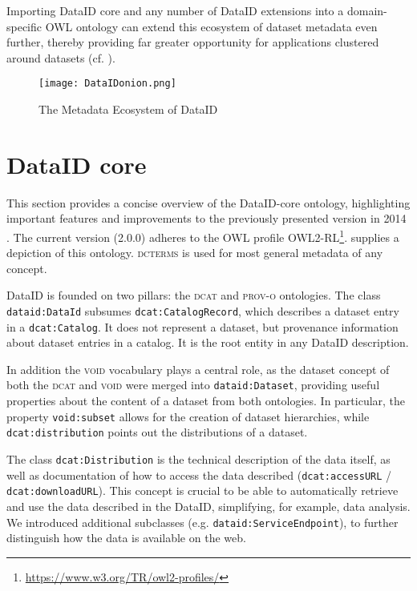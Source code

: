 \documentclass[runningheads,a4paper]{llncs}
\newcommand{\prov}{{\scshape prov-o}\xspace}
\newcommand{\void}{{\scshape void}\xspace}
\newcommand{\dct}{{\scshape dcterms}\xspace}
\newcommand{\dcat}{{\scshape dcat}\xspace}
\newcommand{\prop}[1]{{{\texttt{#1}}}}
\newcommand\footnoteurl[1]{\footnote{\scriptsize\url{#1}}}
\begin{document}
Importing DataID core and any number of DataID extensions into a domain-specific OWL ontology can extend this ecosystem of dataset metadata even further, thereby providing far greater opportunity for applications clustered around datasets (cf. ).

\begin{figure}[t]
\centering
  \texttt{[image: DataIDonion.png]}
  \caption{The Metadata Ecosystem of DataID}
  \label{fig:onion}
  \vspace{-1.5em}
\end{figure}

\section{DataID core} %
\label{dataidCore}
This section provides a concise overview of the DataID-core ontology, highlighting important features and improvements to the previously presented version in 2014 \cite{dataID2014}. The current version (2.0.0) adheres to the OWL profile OWL2-RL\footnoteurl{https://www.w3.org/TR/owl2-profiles/}.
 supplies a depiction of this ontology. \dct is used for most general metadata of any concept.

DataID is founded on two pillars: the \dcat and \prov ontologies. The class \prop{dataid:DataId} subsumes \prop{dcat:CatalogRecord}, which describes a dataset entry in a \prop{dcat:Catalog}. It does not represent a dataset, but provenance information about dataset entries in a catalog. It is the root entity in any DataID description.

In addition the \void vocabulary plays a central role, as the dataset concept of both the \dcat and \void were merged into \prop{dataid:Dataset}, providing useful properties about the content of a dataset from both ontologies. In particular, the property \prop{void:subset} allows for the creation of dataset hierarchies, while \prop{dcat:distribution} points out the distributions of a dataset.

The class \prop{dcat:Distribution} is the technical description of the data itself, as well as documentation of how to access the data described (\prop{dcat:accessURL} / \prop{dcat:downloadURL}). This concept is crucial to be able to automatically retrieve and use the data described in the DataID, simplifying, for example, data analysis. We introduced additional subclasses (e.g. \prop{dataid:ServiceEndpoint}), to further distinguish how the data is available on the web.
\end{document}
